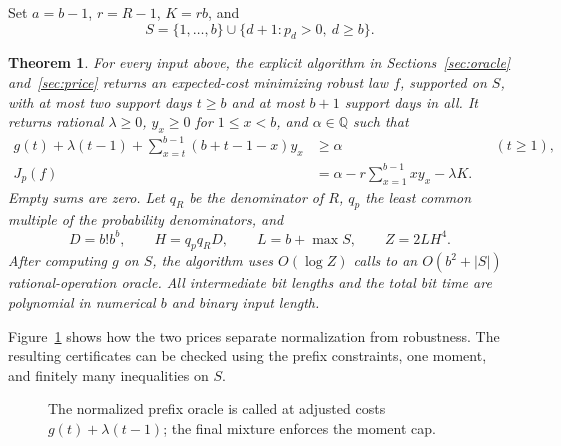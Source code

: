 \documentclass[manuscript,11pt,screen,nonacm]{acmart}
\newtheorem{theorem}{Theorem}
\begin{document}
Set $a=b-1$, $r=R-1$, $K=rb$, and
\begin{equation}\label{eq:S}
 S=\{1,\ldots,b\}\cup\{d+1:p_d>0,\ d\ge b\}.
\end{equation}
\begin{theorem}\label{thm:main}
For every input above, the explicit algorithm in Sections~\ref{sec:oracle}
and~\ref{sec:price} returns an expected-cost minimizing robust law $f$,
supported on $S$, with at most two support days $t\ge b$ and at most $b+1$
support days in all. It returns rational $\lambda\ge0$, $y_x\ge0$ for
$1\le x<b$, and $\alpha\in\mathbb Q$ such that
\begin{align}
 g(t)+\lambda(t-1)+\sum_{x=t}^{b-1}(b+t-1-x)y_x&\ge\alpha
           &&(t\ge1),\label{eq:certificate}\\
 J_p(f)&=\alpha-r\sum_{x=1}^{b-1}xy_x-\lambda K.\label{eq:equality}
\end{align}
Empty sums are zero. Let $q_R$ be the denominator of $R$, $q_p$ the least
common multiple of the probability denominators, and
\begin{equation}\label{eq:bound}
 D=b!b^b,\qquad H=q_pq_RD,\qquad L=b+\max S,\qquad Z=2LH^4.
\end{equation}
After computing $g$ on $S$, the algorithm uses $O(\log Z)$ calls to an
$O(b^2+|S|)$ rational-operation oracle. All intermediate bit lengths and
the total bit time are polynomial in numerical $b$ and binary input length.
\end{theorem}

Figure~\ref{fig:pipeline} shows how the two prices separate normalization
from robustness. The resulting certificates can be checked using the
prefix constraints, one moment, and finitely many inequalities on $S$.
\begin{figure}[ht]
\centering
{}
\caption{The normalized prefix oracle is called at adjusted costs
$g(t)+\lambda(t-1)$; the final mixture enforces the moment cap.}
\label{fig:pipeline}
\end{figure}
\end{document}
